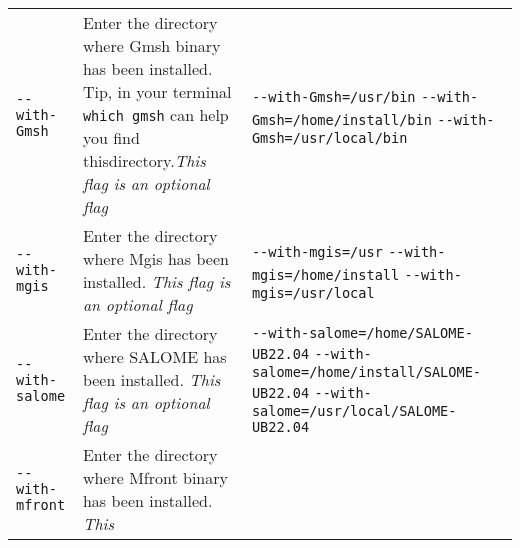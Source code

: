 \begin{longtable}[]{@{}lll@{}}
\begin{minipage}[t]{0.14\columnwidth}\raggedright\strut
\lstinline!--with-Gmsh!\strut
\end{minipage} & \begin{minipage}[t]{0.39\columnwidth}\raggedright\strut
Enter the directory where Gmsh binary has been installed. Tip, in your
terminal \lstinline!which gmsh! can help you find
thisdirectory.\emph{This flag is an optional flag}\strut
\end{minipage} & \begin{minipage}[t]{0.39\columnwidth}\raggedright\strut
\lstinline!--with-Gmsh=/usr/bin!
\lstinline!--with-Gmsh=/home/install/bin!
\lstinline!--with-Gmsh=/usr/local/bin!\strut
\end{minipage}\tabularnewline
\begin{minipage}[t]{0.14\columnwidth}\raggedright\strut
\lstinline!--with-mgis!\strut
\end{minipage} & \begin{minipage}[t]{0.39\columnwidth}\raggedright\strut
Enter the directory where Mgis has been installed. \emph{This flag is an
optional flag}\strut
\end{minipage} & \begin{minipage}[t]{0.39\columnwidth}\raggedright\strut
\lstinline!--with-mgis=/usr! \lstinline!--with-mgis=/home/install!
\lstinline!--with-mgis=/usr/local!\strut
\end{minipage}\tabularnewline
\begin{minipage}[t]{0.14\columnwidth}\raggedright\strut
\lstinline!--with-salome!\strut
\end{minipage} & \begin{minipage}[t]{0.39\columnwidth}\raggedright\strut
Enter the directory where SALOME has been installed. \emph{This flag is
an optional flag}\strut
\end{minipage} & \begin{minipage}[t]{0.39\columnwidth}\raggedright\strut
\lstinline!--with-salome=/home/SALOME-UB22.04!
\lstinline!--with-salome=/home/install/SALOME-UB22.04!
\lstinline!--with-salome=/usr/local/SALOME-UB22.04!\strut
\end{minipage}\tabularnewline
\begin{minipage}[t]{0.14\columnwidth}\raggedright\strut
\lstinline!--with-mfront!\strut
\end{minipage} & \begin{minipage}[t]{0.39\columnwidth}\raggedright\strut
Enter the directory where Mfront binary has been installed. \emph{This
}
\end{minipage}
\end{longtable}
